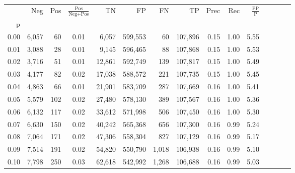 \begin{tabular}{rrrcrrrrrrrrrrr}
\toprule
{} &     Neg &    Pos & $\frac{\text{Pos}}{\text{Neg}+\text{Pos}}$ &       TN &       FP &       FN &       TP &  Prec &   Rec & $\frac{\text{FP}}{\text{P}}$ \\
p    &         &        &                                            &          &          &          &          &       &       &                              \\
\midrule
0.00 &   6,057 &     60 &                                       0.01 &    6,057 &  599,553 &       60 &  107,896 &  0.15 &  1.00 &                         5.55 \\
0.01 &   3,088 &     28 &                                       0.01 &    9,145 &  596,465 &       88 &  107,868 &  0.15 &  1.00 &                         5.53 \\
0.02 &   3,716 &     51 &                                       0.01 &   12,861 &  592,749 &      139 &  107,817 &  0.15 &  1.00 &                         5.49 \\
0.03 &   4,177 &     82 &                                       0.02 &   17,038 &  588,572 &      221 &  107,735 &  0.15 &  1.00 &                         5.45 \\
0.04 &   4,863 &     66 &                                       0.01 &   21,901 &  583,709 &      287 &  107,669 &  0.16 &  1.00 &                         5.41 \\
0.05 &   5,579 &    102 &                                       0.02 &   27,480 &  578,130 &      389 &  107,567 &  0.16 &  1.00 &                         5.36 \\
0.06 &   6,132 &    117 &                                       0.02 &   33,612 &  571,998 &      506 &  107,450 &  0.16 &  1.00 &                         5.30 \\
0.07 &   6,630 &    150 &                                       0.02 &   40,242 &  565,368 &      656 &  107,300 &  0.16 &  0.99 &                         5.24 \\
0.08 &   7,064 &    171 &                                       0.02 &   47,306 &  558,304 &      827 &  107,129 &  0.16 &  0.99 &                         5.17 \\
0.09 &   7,514 &    191 &                                       0.02 &   54,820 &  550,790 &    1,018 &  106,938 &  0.16 &  0.99 &                         5.10 \\
0.10 &   7,798 &    250 &                                       0.03 &   62,618 &  542,992 &    1,268 &  106,688 &  0.16 &  0.99 &                         5.03 \\

\end{tabular}
